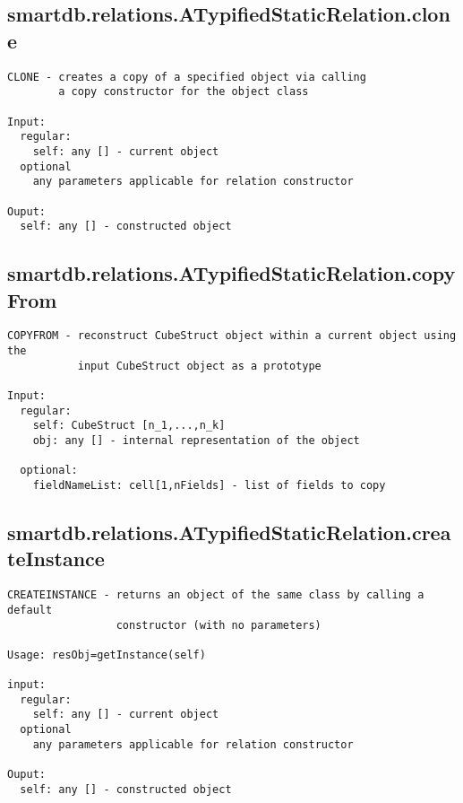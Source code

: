 \subsection{\texorpdfstring{smartdb.relations.ATypifiedStaticRelation.clone}{clone}}\label{method:smartdb.relations.ATypifiedStaticRelation.clone}
\begin{verbatim}
CLONE - creates a copy of a specified object via calling
        a copy constructor for the object class

Input:
  regular:
    self: any [] - current object
  optional
    any parameters applicable for relation constructor

Ouput:
  self: any [] - constructed object
\end{verbatim}
\subsection{\texorpdfstring{smartdb.relations.ATypifiedStaticRelation.copyFrom}{copyFrom}}\label{method:smartdb.relations.ATypifiedStaticRelation.copyFrom}
\begin{verbatim}
COPYFROM - reconstruct CubeStruct object within a current object using the
           input CubeStruct object as a prototype

Input:
  regular:
    self: CubeStruct [n_1,...,n_k]
    obj: any [] - internal representation of the object

  optional:
    fieldNameList: cell[1,nFields] - list of fields to copy
\end{verbatim}
\subsection{\texorpdfstring{smartdb.relations.ATypifiedStaticRelation.createInstance}{createInstance}}\label{method:smartdb.relations.ATypifiedStaticRelation.createInstance}
\begin{verbatim}
CREATEINSTANCE - returns an object of the same class by calling a default
                 constructor (with no parameters)

Usage: resObj=getInstance(self)

input:
  regular:
    self: any [] - current object
  optional
    any parameters applicable for relation constructor

Ouput:
  self: any [] - constructed object
\end{verbatim}
